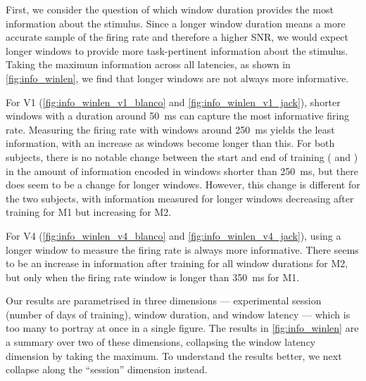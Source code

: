 First, we consider the question of which window duration provides the most information about the stimulus.
Since a longer window duration means a more accurate sample of the firing rate and therefore a higher \ac{SNR}, we would expect longer windows to provide more task-pertinent information about the stimulus.
Taking the maximum information across all latencies, as shown in \autoref{fig:info_winlen}, we find that longer windows are not always more informative.

For \ac{V1} (\autoref{fig:info_winlen_v1_blanco} and \autoref{fig:info_winlen_v1_jack}), shorter windows with a duration around \SI{50}{\milli\second} can capture the most informative firing rate.
Measuring the firing rate with windows around \SI{250}{\milli\second} yields the least information, with an increase as windows become longer than this.
For both subjects, there is no notable change between the start and end of training ( and ) in the amount of information encoded in windows shorter than \SI{250}{\milli\second}, but there does seem to be a change for longer windows.
However, this change is different for the two subjects, with information measured for longer windows decreasing after training for \ac{M1} but increasing for \ac{M2}.

For \ac{V4} (\autoref{fig:info_winlen_v4_blanco} and \autoref{fig:info_winlen_v4_jack}), using a longer window to measure the firing rate is always more informative.
There seems to be an increase in information after training for all window durations for \ac{M2}, but only when the firing rate window is longer than \SI{350}{\milli\second} for \ac{M1}.

Our results are parametrised in three dimensions --- experimental session (number of days of training), window duration, and window latency --- which is too many to portray at once in a single figure.
The results in \autoref{fig:info_winlen} are a summary over two of these dimensions, collapsing the window latency dimension by taking the maximum.
To understand the results better, we next collapse along the ``session'' dimension instead.

